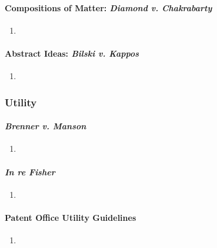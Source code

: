 \paragraph{Compositions of Matter: \emph{Diamond v. Chakrabarty}} %

\begin{enumerate}
    \item
\end{enumerate}

\paragraph{Abstract Ideas: \emph{Bilski v. Kappos}} %

\begin{enumerate}
    \item 
\end{enumerate}


\subsubsection{Utility}

\paragraph{\emph{Brenner v. Manson}} %

\begin{enumerate}
    \item 
\end{enumerate}

\paragraph{\emph{In re Fisher}} %

\begin{enumerate}
    \item 
\end{enumerate}

\paragraph{Patent Office Utility Guidelines} %

\begin{enumerate}
    \item 
\end{enumerate}

